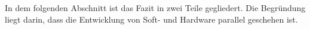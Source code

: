\label{Projektbeschreibung}

In dem folgenden Abschnitt ist das Fazit in zwei Teile gegliedert. Die Begründung liegt darin, dass die Entwicklung von Soft- und Hardware parallel geschehen ist.